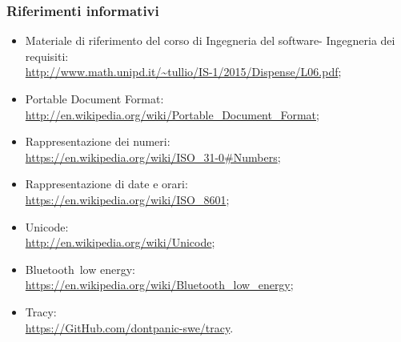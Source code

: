 \documentclass[../AnalisiDeiRequisiti.tex]{subfiles}
\begin{document}
		\subsubsection{Riferimenti informativi}
		\begin{itemize}
			\item Materiale di riferimento del corso di Ingegneria del software\g - Ingegneria dei requisiti: \\\url{http://www.math.unipd.it/~tullio/IS-1/2015/Dispense/L06.pdf};
			\item Portable Document Format:  \\\url{http://en.wikipedia.org/wiki/Portable_Document_Format};
			\item Rappresentazione dei numeri: \\\url{https://en.wikipedia.org/wiki/ISO_31-0#Numbers};
			\item Rappresentazione di date e orari: \\\url{https://en.wikipedia.org/wiki/ISO_8601};
			\item Unicode\g: \\\url{http://en.wikipedia.org/wiki/Unicode};
			\item Bluetooth\g\ low energy: \\\url{https://en.wikipedia.org/wiki/Bluetooth_low_energy};
			\item Tracy\g: \\\url{https://GitHub.com/dontpanic-swe/tracy}.
		\end{itemize}
\end{document}
